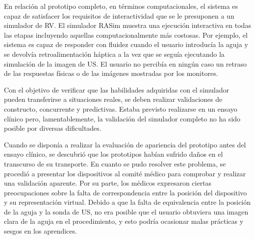 



En relación al prototipo completo, en términos computacionales, el sistema es capaz de satisfacer los requisitos de interactividad que se le presuponen a un simulador de \ac{RV}. El simulador \ac{RASim} muestra una ejecución interactiva en todas las etapas incluyendo aquellas computacionalmente más costosas. Por ejemplo, el sistema es capaz de responder con fluidez cuando el usuario introducía la aguja y se devolvía retroalimentación háptica\new{,} a la vez que se seguía ejecutando la simulación de la imagen de \ac{US}. El usuario no percibía en ningún caso un retraso de las respuestas físicas o de las imágenes mostradas por los monitores.

Con el objetivo de verificar que las habilidades adquiridas con el simulador pueden transferirse a situaciones reales, se deben realizar validaciones de constructo, concurrente y predictivas. Estaba previsto realizarse en un ensayo clínico pero, lamentablemente, la validación del simulador completo no ha sido posible por diversas dificultades.

Cuando se disponía a realizar la evaluación de apariencia del prototipo antes del ensayo clínico, se descubrió que los prototipos habían sufrido daños en el transcurso de su transporte.%
En cuanto se pudo resolver este problema, se procedió a presentar los dispositivos al comité médico para comprobar y realizar una validación aparente. Por su parte, los médicos expresaron ciertas preocupaciones sobre la falta de correspondencia entre la posición del dispositivo y su representación virtual. Debido a que la falta de equivalencia entre la posición de la aguja y la sonda de \ac{US}, no era posible que el usuario obtuviera una imagen clara de la aguja en el procedimiento, y esto podría ocasionar malas prácticas y sesgos en los aprendices. 

